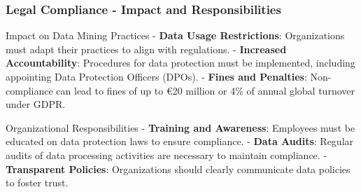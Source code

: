 \documentclass{beamer}
\begin{document}
\begin{frame}[fragile]
    \frametitle{Legal Compliance - Impact and Responsibilities}
    \begin{block}{Impact on Data Mining Practices}
        - \textbf{Data Usage Restrictions}: Organizations must adapt their practices to align with regulations.
        - \textbf{Increased Accountability}: Procedures for data protection must be implemented, including appointing Data Protection Officers (DPOs).
        - \textbf{Fines and Penalties}: Non-compliance can lead to fines of up to €20 million or 4\% of annual global turnover under GDPR.
    \end{block}

    \begin{block}{Organizational Responsibilities}
        - \textbf{Training and Awareness}: Employees must be educated on data protection laws to ensure compliance.
        - \textbf{Data Audits}: Regular audits of data processing activities are necessary to maintain compliance.
        - \textbf{Transparent Policies}: Organizations should clearly communicate data policies to foster trust.
    \end{block}
\end{frame}
\end{document}
